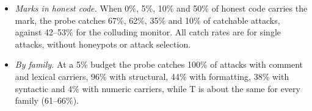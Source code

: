 \documentclass[11pt,letterpaper]{article}
\providecommand{\tightlist}{\setlength{\itemsep}{1pt}\setlength{\parskip}{0pt}}
\begin{document}
\begin{itemize}
  \begin{itemize}
  \tightlist
  \item A combined protocol flags a task on the larger of its two percentile ranks. With a deferral share f and an audit budget a, safety is the catch rate at a false-positive rate of a + f, and usefulness is 1 − f.
  \item Each protocol sets its threshold on its own honest scores over all 12 carriers, so catchable rates differ from Section 4.1.
  \item Intervals resample problems with thresholds held fixed. Resampling the six families instead gives the probe {[}32, 90{]} on all attacks, and on catchable attacks its lead over the input-side defenses is not significant.
  \end{itemize}
\item
  \emph{Marks in honest code.} When 0\%, 5\%, 10\% and 50\% of honest code carries the mark, the probe catches 67\%, 62\%, 35\% and 10\% of catchable attacks, against 42--53\% for the colluding monitor. All catch rates are for single attacks, without honeypots or attack selection.
\item
  \emph{By family.} At a 5\% budget the probe catches 100\% of attacks with comment and lexical carriers, 96\% with structural, 44\% with formatting, 38\% with syntactic and 4\% with numeric carriers, while T is about the same for every family (61--66\%).
\end{itemize}
\end{document}
